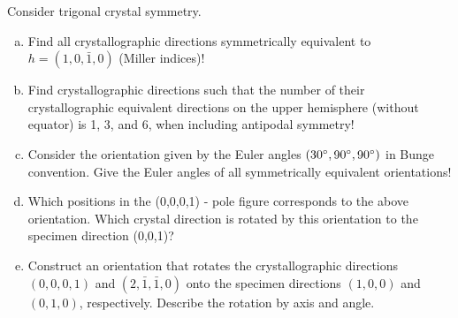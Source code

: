 \begin{frame}

  \begin{Exercise}
    Consider trigonal crystal symmetry.

  \begin{enumerate}[a)]
    \item Find all crystallographic directions symmetrically equivalent to $h
      = (1, 0, \bar 1, 0)$ (Miller indices)!
    \item Find crystallographic directions such that the number of their
      crystallographic equivalent directions on the upper hemisphere (without
      equator) is 1, 3, and 6, when including antipodal symmetry!
    \item Consider the orientation given by the Euler angles $(30^\circ,
      90^\circ, 90^\circ)$ in Bunge convention. Give the Euler angles of 
      all symmetrically equivalent orientations!
    \item Which positions in the (0,0,0,1) - pole figure corresponds to the
      above orientation. Which crystal direction is rotated by this
      orientation to the specimen direction (0,0,1)?
    \item Construct an orientation that rotates the crystallographic
      directions $(0,0,0,1)$ and $(2,\bar 1,\bar 1,0)$ onto the specimen
      directions $(1,0,0)$ and $(0,1,0)$, respectively. Describe the rotation
      by axis and angle.
    \end{enumerate}

  \end{Exercise}

\end{frame}


